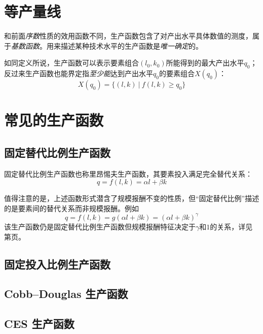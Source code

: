 \section{等产量线}
\label{sec:isoquant-curve}

和前面\emph{序数}性质的效用函数不同，生产函数包含了对产出水平具体数值的测度，属于\emph{基数函数}。用来描述某种技术水平的生产函数是\emph{唯一确定}的。

如同定义所说，生产函数可以表示要素组合$(l_0,k_0)$所能得到的最大产出水平$q_0$；反过来生产函数也能界定指\emph{至少能}达到产出水平$q_0$的要素组合$X(q_0)$：
\begin{equation}
X(q_0) = \{(l,k)~|~f(l,k) \ge q_0\}
\label{eq:product-function-isoquanty}
\end{equation}


\section{常见的生产函数}
\subsection[固定替代比例]{固定替代比例生产函数}

固定替代比例生产函数也称里昂惕夫生产函数，其要素投入满足完全替代关系：
\begin{equation}
q = f(l,k) = \alpha l+ \beta k
\end{equation}

值得注意的是，上述函数形式潜含了规模报酬不变的性质，但“固定替代比例”描述的是要素间的替代关系而非规模报酬。例如
\begin{equation}
q = f(l,k) = g(\alpha l+ \beta k) = (\alpha l+ \beta k)^\gamma
\end{equation}
该生产函数仍是固定替代比例生产函数但规模报酬特征决定于$\gamma$和$1$的关系，详见第\pageref{subsec:returns-to-scale-of-linear-production-function}页。

\subsection[固定投入比例]{固定投入比例生产函数}

\subsection[Cobb--Douglas]{Cobb--Douglas 生产函数}

\subsection[CES]{CES 生产函数}

